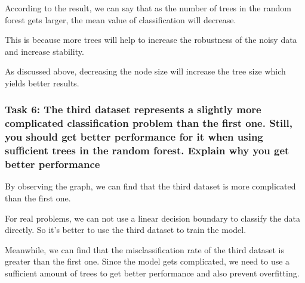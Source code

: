 \documentclass[
]{article}
\begin{document}
According to the result, we can say that as the number of trees in the
random forest gets larger, the mean value of classification will
decrease.

This is because more trees will help to increase the robustness of the
noisy data and increase stability.

As discussed above, decreasing the node size will increase the tree size
which yields better results.

\hypertarget{task-6-the-third-dataset-represents-a-slightly-more-complicated-classification-problem-than-the-first-one.-still-you-should-get-better-performance-for-it-when-using-sufficient-trees-in-the-random-forest.-explain-why-you-get-better-performance}{%
\subsubsection{Task 6: The third dataset represents a slightly more
complicated classification problem than the first one. Still, you should
get better performance for it when using sufficient trees in the random
forest. Explain why you get better
performance}\label{task-6-the-third-dataset-represents-a-slightly-more-complicated-classification-problem-than-the-first-one.-still-you-should-get-better-performance-for-it-when-using-sufficient-trees-in-the-random-forest.-explain-why-you-get-better-performance}}

By observing the graph, we can find that the third dataset is more
complicated than the first one.

For real problems, we can not use a linear decision boundary to classify
the data directly. So it's better to use the third dataset to train the
model.

Meanwhile, we can find that the misclassification rate of the third
dataset is greater than the first one. Since the model gets complicated,
we need to use a sufficient amount of trees to get better performance
and also prevent overfitting.
\end{document}
